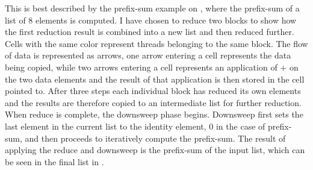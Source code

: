 This is best described by the prefix-sum example on , where
the prefix-sum of a list of 8 elements is computed. I have chosen to reduce two
blocks to show how the first reduction result is combined into a new list and
then reduced further. Cells with the same color represent threads belonging to
the same block. The flow of data is represented as arrows, one arrow entering a
cell represents the data being copied, while two arrows entering a cell
represents an application of + on the two data elements and the result of that
application is then stored in the cell pointed to. After three steps each
individual block has reduced its own elements and the results are therefore
copied to an intermediate list for further reduction. When reduce is complete,
the downsweep phase begins. Downsweep first sets the last element in the current
list to the identity element, 0 in the case of prefix-sum, and then proceeds to
iteratively compute the prefix-sum. The result of applying the reduce and
downsweep is the prefix-sum of the input list, which can be seen in the final
list in .





 
\newcommand{\drawArray}[4]{
  \draw (#1,#2) -> (#3,#2);
  \draw (#1,#4) -> (#3,#4);
  \foreach \x in {#1,...,#3} \draw (\x,#2) -> (\x,#4);
}


